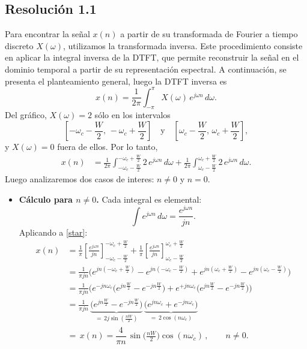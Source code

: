 \documentclass[
  11pt,
  letterpaper,
   addpoints,
   answers
  ]{exam}
\begin{document}
\begin{questions}
\begin{solution}
\subsection*{Resolución 1.1}
 Para encontrar la señal $x(n)$ a partir de su transformada de Fourier a tiempo discreto $X(\omega)$, utilizamos la transformada inversa. Este procedimiento consiste en aplicar la integral inversa de la DTFT, que permite reconstruir la señal en el dominio temporal a partir de su representación espectral. A continuación, se presenta el planteamiento general, luego la DTFT inversa es
\[
x(n)=\frac{1}{2\pi}\int_{-\pi}^{\pi}X(\omega)\,e^{j\omega n}\,d\omega.
\]
Del gráfico, $X(\omega)=2$ sólo en los intervalos
\[
\left[-\omega_c-\frac{W}{2},\, -\omega_c+\frac{W}{2}\right]
\quad\text{y}\quad
\left[\omega_c-\frac{W}{2},\, \omega_c+\frac{W}{2}\right],
\]
y $X(\omega)=0$ fuera de ellos. Por lo tanto,
\begin{align*}
x(n)
&=\frac{1}{2\pi}\int_{-\omega_c-\frac{W}{2}}^{-\omega_c+\frac{W}{2}}2\,e^{j\omega n}\,d\omega
+\frac{1}{2\pi}\int_{\omega_c-\frac{W}{2}}^{\omega_c+\frac{W}{2}}2\,e^{j\omega n}\,d\omega. \tag{$\star$}
\label{star}
\end{align*}
Luego analizaremos dos casos de interes: $n\neq 0$ y $n=0$.
\begin{itemize}
  \item  \textbf{Cálculo para $n\neq 0$.} Cada integral es elemental:
\[
\int e^{j\omega n}\,d\omega=\frac{e^{j\omega n}}{j n}.
\]
Aplicando a \eqref{star}:
\begin{align*}
x(n)
&=\frac{1}{\pi}\left[\frac{e^{j\omega n}}{j n}\right]_{-\omega_c-\frac{W}{2}}^{-\omega_c+\frac{W}{2}}
+\frac{1}{\pi}\left[\frac{e^{j\omega n}}{j n}\right]_{\omega_c-\frac{W}{2}}^{\omega_c+\frac{W}{2}}\\[2mm]
&=\frac{1}{\pi j n}\Big(
e^{j n(-\omega_c+\frac{W}{2})}-e^{j n(-\omega_c-\frac{W}{2})}
+e^{j n(\omega_c+\frac{W}{2})}-e^{j n(\omega_c-\frac{W}{2})}
\Big)\\[1mm]
&=\frac{1}{\pi j n}\Big(
e^{-j n\omega_c}\big(e^{j n\frac{W}{2}}-e^{-j n\frac{W}{2}}\big)
+e^{+j n\omega_c}\big(e^{j n\frac{W}{2}}-e^{-j n\frac{W}{2}}\big)
\Big)\\[1mm]
&=\frac{1}{\pi j n}\,\underbrace{\big(e^{j n\frac{W}{2}}-e^{-j n\frac{W}{2}}\big)}_{=\,2j\sin(\frac{nW}{2})}\,
\underbrace{\big(e^{j n\omega_c}+e^{-j n\omega_c}\big)}_{=\,2\cos(n\omega_c)}\\[1mm]
&=\boxed{\,x(n)=\dfrac{4}{\pi n}\,\sin\!\Big(\frac{nW}{2}\Big)\cos(n\omega_c)\,},\qquad n\neq 0.
\end{align*}

\end{itemize}
\end{solution}
\end{questions}
\end{document}
